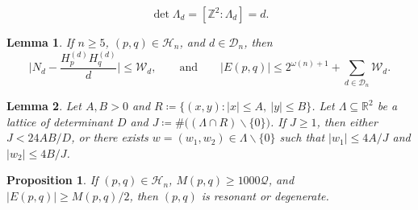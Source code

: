 \documentclass[10pt,a4paper]{amsart}
\newtheorem{lemma}{Lemma}
\newtheorem{proposition}{Proposition}
\newcommand{\R}{\mathbb{R}}
\newcommand{\Z}{\mathbb{Z}}
\begin{document}
\begin{equation}
\label{eqn:detLambda}
\det\Lambda_d=[\Z^2:\Lambda_d]=d.
\end{equation}

\begin{lemma}
\label{lem:majd}
If $n\ge5$, $(p,q)\in\mathcal{H}_n$, and $d\in\mathcal{D}_n$, then
\[
\Big|N_d-\frac{H^{(d)}_pH^{(d)}_q}{d}\Big|\le\mathcal{W}_d, \qquad\text{and}\qquad |E(p,q)|\le 2^{\omega(n)+1}+\sum_{d\in\mathcal{D}_n}\mathcal{W}_d.
\]
\end{lemma}

\begin{lemma}
\label{lem:lattice}
Let $A,B>0$ and $R\coloneq \{(x,y)\colon|x|\le A,\ |y|\le B\}$.  Let $\Lambda\subseteq\R^2$ be a lattice of determinant $D$ and  $J\coloneq \#\big((\Lambda\cap R)\smallsetminus\{0\}\big)$.  If $J\ge1$, then either $J<24AB/D$, or there exists $w=(w_1,w_2)\in\Lambda\smallsetminus\{0\}$ such that $|w_1|\le4A/J$ and $|w_2|\le4B/J$.
\end{lemma}

\begin{proposition}
\label{prop:reduction}
If $(p,q)\in\mathcal{H}_n$, $M(p,q)\ge1000 \mathcal{Q}$, and $|E(p,q)|\ge M(p,q)/2$, then $(p,q)$ is resonant or degenerate.
\end{proposition}
\end{document}
